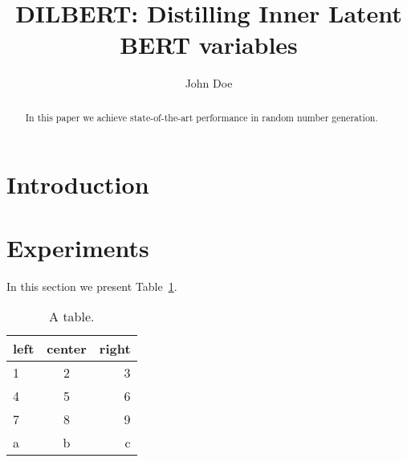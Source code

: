 \documentclass{article}
\title{DILBERT: Distilling Inner Latent BERT variables}
\author{John Doe}
\begin{document}
\maketitle
\begin{abstract}
  In this paper we achieve state-of-the-art performance in random number generation.
\end{abstract}
\section{Introduction}
\section{Experiments}
In this section we present Table~\ref{tab}.
  \begin{table}
    \begin{tabular}{lcr} \toprule
      left & center & right\\\midrule
      1 & 2 & 3\\
      4 & 5 & 6\\\midrule
      7 & 8 & 9\\
      a & b & c\\\bottomrule
    \end{tabular}
    \caption{A table.}
    \label{tab}
  \end{table}
\end{document}
